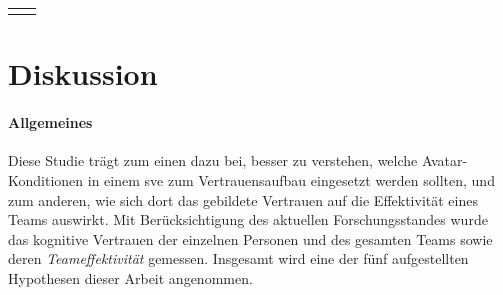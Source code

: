 \documentclass[a4paper,11pt]{article}%
\renewcommand{\\}{\vspace*{0.5\baselineskip} \newline}
\begin{document}
{{\begin{table}[H]
\begin{tabularx}{\textwidth}{| p{12cm} | p{3.5cm}}
		\hline 	\\
		
	\end{tabularx}
\end{table}		


\newpage
\section{Diskussion}

%	
%
%
%
%
%
%
	

\paragraph{Allgemeines}
	Diese Studie trägt zum einen dazu bei, besser zu verstehen, welche Avatar- Konditionen in einem \ac{sve} zum Vertrauensaufbau eingesetzt werden sollten, und zum anderen, wie sich dort das gebildete Vertrauen auf die Effektivität eines Teams auswirkt. Mit Berücksichtigung des aktuellen Forschungsstandes wurde das kognitive Vertrauen der einzelnen Personen und des gesamten Teams sowie deren \textit{Teameffektivität} gemessen. Insgesamt wird eine der fünf aufgestellten Hypothesen dieser Arbeit angenommen.




}}
\end{document}
